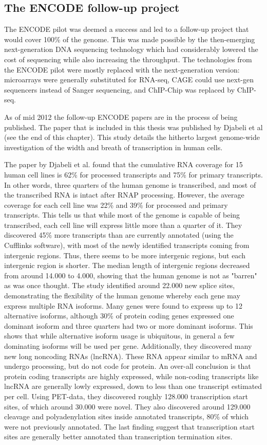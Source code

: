 \subsection{The ENCODE follow-up project}
The ENCODE pilot was deemed a success and led to a follow-up project that would
cover 100\% of the genome. This was made possible by the then-emerging
next-generation DNA sequencing technology which had considerably lowered the
cost of sequencing while also increasing the throughput. The technologies from
the ENCODE pilot were mostly replaced with the next-generation version:
microarrays were generally substituted for RNA-seq, CAGE could use next-gen
sequencers instead of Sanger sequencing, and ChIP-Chip was replaced by
ChIP-seq.

As of mid 2012 the follow-up ENCODE papers are in the process of being
published. The paper that is included in this thesis was published by Djabeli
et al (see the end of this chapter). This study details the hitherto largest
genome-wide investigation of the width and breath of transcription in human
cells.

The paper by Djabeli et al. found that the cumulative RNA coverage for 15 human
cell lines is 62\% for processed transcripts and 75\% for primary transcripts.
In other words, three quarters of the human genome is transcribed, and most of
the transcribed RNA is intact after RNAP processing. However, the average
coverage for each cell line was 22\% and 39\% for processed and primary
transcripts. This tells us that while most of the genome is capable of being
transcribed, each cell line will express little more than a quarter of it. They
discovered 45\% more transcripts than are currently annotated (using the
Cufflinks software), with most of the newly identified transcripts coming from
intergenic regions. Thus, there seems to be more intergenic regions, but each
intergenic region is shorter. The median length of intergenic regions decreased
from around 14.000 to 4.000, showing that the human genome is not as "barren"
as was once thought. The study identified around 22.000 new splice sites,
demonstrating the flexibility of the human genome whereby each gene may express
multiple RNA isoforms. Many genes were found to express up to 12 alternative
isoforms, although 30\% of protein coding genes expressed one dominant isoform
and three quarters had two or more dominant isoforms. This shows that while
alternative isoform usage is ubiquitous, in general a few dominating isoforms
will be used per gene. Additionally, they discovered many new long noncoding
RNAs (lncRNA). These RNA appear similar to mRNA and undergo processing, but do
not code for protein. An over-all conclusion is that protein coding transcripts
are highly expressed, while non-coding transcripts like lncRNA are generally
lowly expressed, down to less than one transcript estimated per cell. Using
PET-data, they discovered roughly 128.000 transcription start sites, of
which around 30.000 were novel. They also discovered around 129.000 cleavage
and polyadenylation sites inside annotated transcripts, 80\% of which were not
previously annotated. The last finding suggest that transcription start sites
are generally better annotated than transcription termination sites.

